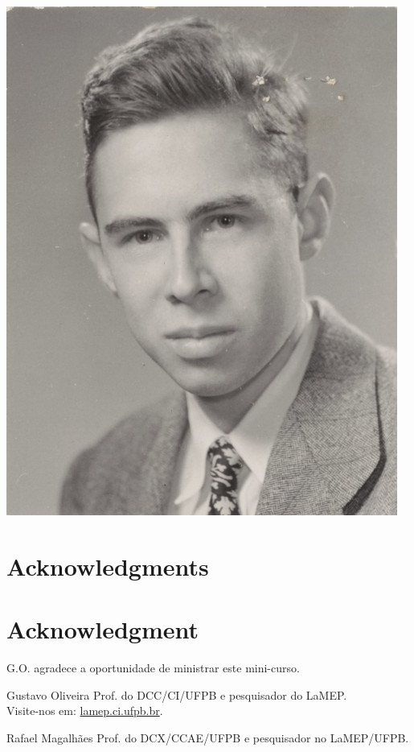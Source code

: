 \documentclass[10pt,journal,compsoc]{IEEEtran}
\begin{document}
\includegraphics[scale=0.154]{figs/a-3rosenblatt.jpeg}


\ifCLASSOPTIONcompsoc
  \section*{Acknowledgments}
\else
  \section*{Acknowledgment}
\fi
G.O. agradece a oportunidade de ministrar este mini-curso.






\begin{IEEEbiographynophoto}{Gustavo Oliveira}
Prof. do DCC/CI/UFPB e pesquisador do LaMEP. \\
Visite-nos em: \url{lamep.ci.ufpb.br}.
\end{IEEEbiographynophoto}

\begin{IEEEbiographynophoto}{Rafael Magalhães}
Prof. do DCX/CCAE/UFPB e pesquisador no LaMEP/UFPB.
\end{IEEEbiographynophoto}
\end{document}
